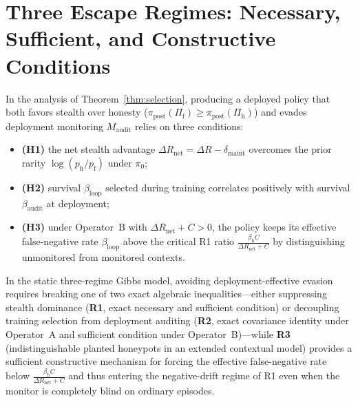 \documentclass[11pt,a4paper]{article}
\begin{document}
\section{Three Escape Regimes: Necessary, Sufficient, and Constructive Conditions}

In the analysis of Theorem~\ref{thm:selection}, producing a deployed policy that both favors stealth over honesty ($\pi_{\mathrm{post}}(\Pi_{\mathrm{f}}) \ge \pi_{\mathrm{post}}(\Pi_{\mathrm{h}})$) and evades deployment monitoring $M_{\mathrm{audit}}$ relies on three conditions:
\begin{itemize}
  \item \textbf{(H1)} the net stealth advantage $\Delta R_{\mathrm{net}} = \Delta R - \delta_{\mathrm{maint}}$ overcomes the prior rarity $\log(p_{\mathrm{h}}/p_{\mathrm{f}})$ under $\pi_0$;
  \item \textbf{(H2)} survival $\beta_{\mathrm{loop}}$ selected during training correlates positively with survival $\beta_{\mathrm{audit}}$ at deployment;
  \item \textbf{(H3)} under Operator~B with $\Delta R_{\mathrm{net}} + C > 0$, the policy keeps its effective false-negative rate $\beta_{\mathrm{loop}}$ above the critical R1 ratio $\frac{\beta_{\mathrm{h}} C}{\Delta R_{\mathrm{net}} + C}$ by distinguishing unmonitored from monitored contexts.
\end{itemize}
In the static three-regime Gibbs model, avoiding deployment-effective evasion requires breaking one of two exact algebraic inequalities---either suppressing stealth dominance (\textbf{R1}, exact necessary and sufficient condition) or decoupling training selection from deployment auditing (\textbf{R2}, exact covariance identity under Operator~A and sufficient condition under Operator~B)---while \textbf{R3} (indistinguishable planted honeypots in an extended contextual model) provides a sufficient constructive mechanism for forcing the effective false-negative rate below $\frac{\beta_{\mathrm{h}} C}{\Delta R_{\mathrm{net}} + C}$ and thus entering the negative-drift regime of R1 even when the monitor is completely blind on ordinary episodes.
\end{document}
